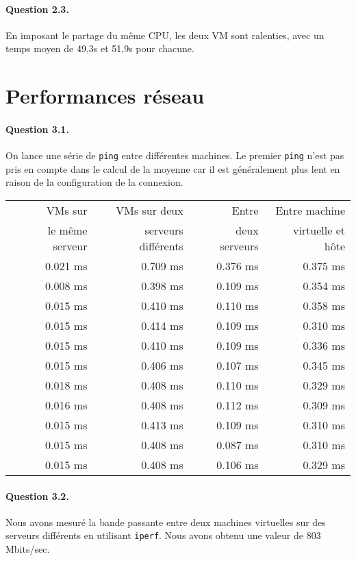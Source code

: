 \documentclass[a4paper]{article}
\begin{document}
\paragraph{Question 2.3.} En imposant le partage du même CPU, les deux VM sont ralenties, avec un temps moyen de 49,3s et 51,9s pour chacune.

\section{Performances réseau}
\paragraph{Question 3.1.} On lance une série de \texttt{ping} entre différentes machines. Le premier \texttt{ping} n'est pas pris en compte dans le calcul de la moyenne car il est généralement plus lent en raison de la configuration de la connexion.
\begin{center}
\begin{tabular}{r r r r}
VMs sur &
VMs sur deux &
Entre &
Entre machine \\
le même serveur &
serveurs différents &
deux serveurs &
virtuelle et hôte \\ \hline
0.021 ms & 0.709 ms & 0.376 ms & 0.375 ms \\
0.008 ms & 0.398 ms & 0.109 ms & 0.354 ms \\
0.015 ms & 0.410 ms & 0.110 ms & 0.358 ms \\
0.015 ms & 0.414 ms & 0.109 ms & 0.310 ms \\
0.015 ms & 0.410 ms & 0.109 ms & 0.336 ms \\
0.015 ms & 0.406 ms & 0.107 ms & 0.345 ms \\
0.018 ms & 0.408 ms & 0.110 ms & 0.329 ms \\
0.016 ms & 0.408 ms & 0.112 ms & 0.309 ms \\
0.015 ms & 0.413 ms & 0.109 ms & 0.310 ms \\
0.015 ms & 0.408 ms & 0.087 ms & 0.310 ms \\ \hline
0.015 ms & 0.408 ms & 0.106 ms & 0.329 ms
\end{tabular}
\end{center}

\paragraph{Question 3.2.}
Nous avons mesuré la bande passante entre deux machines virtuelles sur des serveurs différents en utilisant \texttt{iperf}.
Nous avons obtenu une valeur de 803 Mbits/sec.
\end{document}
